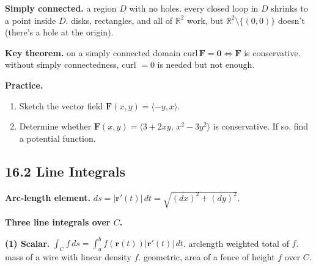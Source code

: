 \documentclass[12pt]{article}
\theoremstyle{compact}
\renewcommand{\vec}[1]{\mathbf{#1}}
\newcommand{\R}{\mathbb{R}}
\begin{document}
\textbf{Simply connected.} a region $D$ with no holes. every closed loop in $D$ shrinks to a point inside $D$. disks, rectangles, and all of $\R^2$ work, but $\R^2\setminus\{(0,0)\}$ doesn't (there's a hole at the origin).

\begin{center}
\end{center}

\textbf{Key theorem.} on a simply connected domain $\text{curl}\,\vec{F}=\vec{0}\iff\vec{F}$ is conservative. without simply connectedness, curl $=0$ is needed but not enough.

\medskip\textbf{Practice.}
\begin{enumerate}[noitemsep]
  \item Sketch the vector field $\vec{F}(x,y)=\langle -y,x\rangle$.
  \item Determine whether $\vec{F}(x,y)=\langle 3+2xy,\,x^2-3y^2\rangle$ is conservative. If so, find a potential function.
\end{enumerate}

\subsection{16.2 Line Integrals}

\textbf{Arc-length element.} $ds = |\vec{r}'(t)|\,dt = \sqrt{(dx)^2+(dy)^2}$.

\textbf{Three line integrals over $C$.}

\textbf{(1) Scalar.} $\displaystyle\int_C f\,ds = \int_a^b f(\vec{r}(t))|\vec{r}'(t)|\,dt$. arclength weighted total of $f$. mass of a wire with linear density $f$. geometric, area of a fence of height $f$ over $C$.
\end{document}
